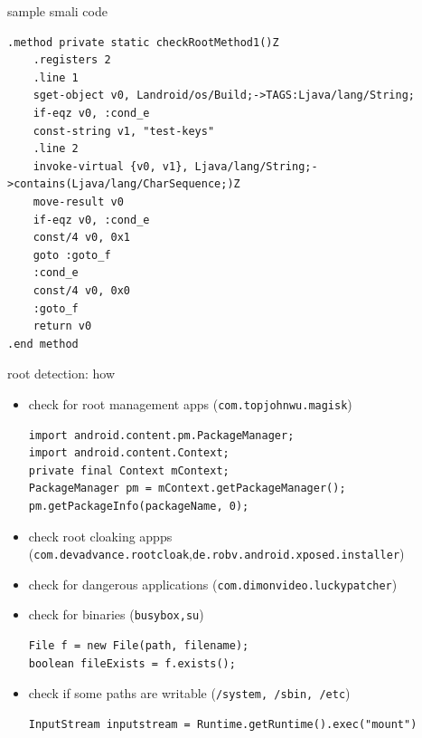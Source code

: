 \documentclass{beamer}
\begin{document}



\begin{frame}[fragile]{sample smali code}

\begin{verbatim}
.method private static checkRootMethod1()Z
    .registers 2
    .line 1
    sget-object v0, Landroid/os/Build;->TAGS:Ljava/lang/String;
    if-eqz v0, :cond_e
    const-string v1, "test-keys"
    .line 2
    invoke-virtual {v0, v1}, Ljava/lang/String;->contains(Ljava/lang/CharSequence;)Z
    move-result v0
    if-eqz v0, :cond_e
    const/4 v0, 0x1
    goto :goto_f
    :cond_e
    const/4 v0, 0x0
    :goto_f
    return v0
.end method
\end{verbatim}
    
\end{frame}

\begin{frame}[fragile]{root detection: how}

    \begin{itemize}
        \item check for root management apps (\texttt{com.topjohnwu.magisk})
\begin{verbatim}
import android.content.pm.PackageManager;
import android.content.Context;
private final Context mContext;
PackageManager pm = mContext.getPackageManager();
pm.getPackageInfo(packageName, 0);
\end{verbatim}
        \item check root cloaking appps {\small (\texttt{com.devadvance.rootcloak},\texttt{de.robv.android.xposed.installer})}
        \item check for dangerous applications (\texttt{com.dimonvideo.luckypatcher})
        \item check for binaries (\texttt{busybox,su})
\begin{verbatim}
File f = new File(path, filename);
boolean fileExists = f.exists();
\end{verbatim}
        \item check if some paths are writable (\texttt{/system, /sbin, /etc})
\begin{verbatim}
InputStream inputstream = Runtime.getRuntime().exec("mount")
\end{verbatim}
    \end{itemize}

\end{frame}
\end{document}
